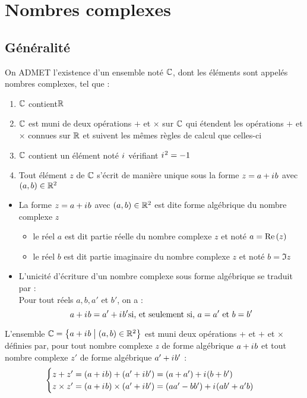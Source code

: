 \chapter{Nombres complexes}

\minitoc
\section{Généralité}
\begin{defi}[Propriété de \(\C\)]

	On ADMET l'existence d’un ensemble noté \(\C\), dont les éléments sont appelés nombres complexes, tel que :
	\begin{enumerate}
		\item \(\C\) contient\(\mathbb{R} \)
		\item \(\C\) est muni de deux opérations \(+\) et \(\times\) sur \(\C\) qui étendent les opérations \(+\) et \(\times\) connues sur \(\mathbb{R}\) et suivent les mêmes règles de calcul que celles-ci
		\item \(\C\) contient un élément noté \(i\mkern1mu\) vérifiant \(i\mkern1mu^2 = -1\)
		\item Tout élément \(z\) de \(\C\) s'écrit de manière unique sous la forme \(z = a+i\mkern1mu b\) avec \(\left(a,b\right) \in \mathbb{R}^2\)
	\end{enumerate}
\end{defi}
\begin{rem}
	\begin{itemize}
		\item La forme \(z = a+i\mkern1mu b\)  avec \(\left(a,b\right) \in \mathbb{R}^2\) est dite forme algébrique du nombre complexe \(z\) \begin{itemize}
			      \item le réel \(a\) est dit partie réelle du nombre complexe \(z\) et noté \(a = \operatorname{Re}\left(z\right)\)
			      \item le réel \(b\) est dit partie imaginaire du nombre complexe \(z\) et noté \(b = \Im{z}\)
		      \end{itemize}
		\item L'unicité d'écriture d'un nombre complexe sous forme algébrique se traduit par : \\
		      Pour tout réels \(a,b,a'\) et \(b'\), on a :
		      \[a+i\mkern1mu b = a'+i\mkern1mu b' \text{si, et seulement si, } a=a' \text{ et } b= b'\]
	\end{itemize}
\end{rem}

\begin{defprop}
	L’ensemble \(\mathbb{C} = \left\lbrace a + i\mkern1mu b \;\middle|\; \left(a, b\right) \in \mathbb{R}^2\right\rbrace\) est muni deux opérations + et \(+\) et \(\times\) définies par, pour tout nombre complexe \(z\) de forme algébrique \(a + i\mkern1mu b\) et tout nombre complexe \(z'\) de forme algébrique \(a' + i\mkern1mu b'\) : \[\begin{cases}
			z+z' = (a+i\mkern1mu b) + (a'+i\mkern1mu b') = (a+a')+i\mkern1mu(b+b') \\
			z \times z' = (a+i\mkern1mu b) \times (a'+i\mkern1mu b') = (aa'-bb') + i\mkern1mu(ab'+a'b)
		\end{cases}\]
\end{defprop}

